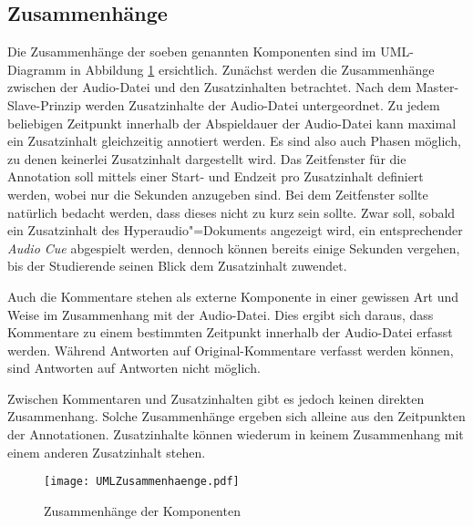 \subsection{Zusammenhänge}
\label{sec:komponenten_zusammenhaenge}
Die Zusammenhänge der soeben genannten Komponenten sind im UML-Diagramm in Abbildung \ref{fig:UMLAufbau} ersichtlich. Zunächst werden die Zusammenhänge zwischen der Audio-Datei und den Zusatzinhalten betrachtet. Nach dem Master-Slave-Prinzip werden Zusatzinhalte der Audio-Datei untergeordnet. Zu jedem beliebigen Zeitpunkt innerhalb der Abspieldauer der Audio-Datei kann maximal ein Zusatzinhalt gleichzeitig annotiert werden. Es sind also auch Phasen möglich, zu denen keinerlei Zusatzinhalt dargestellt wird. Das Zeitfenster für die Annotation soll mittels einer Start- und Endzeit pro Zusatzinhalt definiert werden, wobei nur die Sekunden anzugeben sind. Bei dem Zeitfenster sollte natürlich bedacht werden, dass dieses nicht zu kurz sein sollte. Zwar soll, sobald ein Zusatzinhalt des Hyperaudio"=Dokuments angezeigt wird, ein entsprechender \textit{Audio Cue} abgespielt werden, dennoch können bereits einige Sekunden vergehen, bis der Studierende seinen Blick dem Zusatzinhalt zuwendet.

Auch die Kommentare stehen als externe Komponente in einer gewissen Art und Weise im Zusammenhang mit der Audio-Datei. Dies ergibt sich daraus, dass Kommentare zu einem bestimmten Zeitpunkt innerhalb der Audio-Datei erfasst werden. Während Antworten auf Original-Kommentare verfasst werden können, sind Antworten auf Antworten nicht möglich.

Zwischen Kommentaren und Zusatzinhalten gibt es jedoch keinen direkten Zusammenhang. Solche Zusammenhänge ergeben sich alleine aus den Zeitpunkten der Annotationen. Zusatzinhalte können wiederum in keinem Zusammenhang mit einem anderen Zusatzinhalt stehen.


\begin{figure}[h!]
\texttt{[image: UMLZusammenhaenge.pdf]}
\caption{\label{fig:UMLAufbau}Zusammenhänge der Komponenten}
\end{figure}


